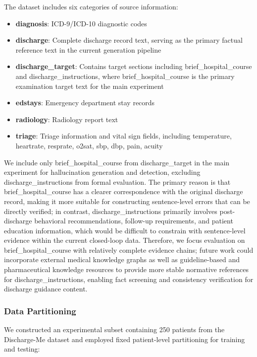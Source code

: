 \documentclass[11pt]{article}
\begin{document}
The dataset includes six categories of source information:

\begin{itemize}
\item
  \textbf{diagnosis}: ICD-9/ICD-10 diagnostic codes
\item
  \textbf{discharge}: Complete discharge record text, serving as the primary factual reference text in the current generation pipeline
\item
  \textbf{discharge\_target}: Contains target sections including brief\_hospital\_course and discharge\_instructions, where brief\_hospital\_course is the primary examination target text for the main experiment
\item
  \textbf{edstays}: Emergency department stay records
\item
  \textbf{radiology}: Radiology report text
\item
  \textbf{triage}: Triage information and vital sign fields, including temperature, heartrate, resprate, o2sat, sbp, dbp, pain, acuity
\end{itemize}

We include only brief\_hospital\_course from discharge\_target in the main experiment for hallucination generation and detection, excluding discharge\_instructions from formal evaluation. The primary reason is that brief\_hospital\_course has a clearer correspondence with the original discharge record, making it more suitable for constructing sentence-level errors that can be directly verified; in contrast, discharge\_instructions primarily involves post-discharge behavioral recommendations, follow-up requirements, and patient education information, which would be difficult to constrain with sentence-level evidence within the current closed-loop data. Therefore, we focus evaluation on brief\_hospital\_course with relatively complete evidence chains; future work could incorporate external medical knowledge graphs as well as guideline-based and pharmaceutical knowledge resources to provide more stable normative references for discharge\_instructions, enabling fact screening and consistency verification for discharge guidance content.

\subsubsection{Data Partitioning}

We constructed an experimental subset containing 250 patients from the Discharge-Me dataset and employed fixed patient-level partitioning for training and testing:
\end{document}
